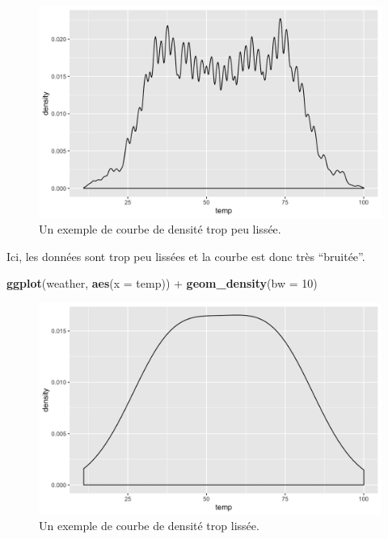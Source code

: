 \documentclass[a4paperpaper,]{article}
\newenvironment{Shaded}{\begin{snugshade}}{\end{snugshade}}
\newcommand{\DataTypeTok}[1]{\textcolor[rgb]{0.00,0.34,0.68}{#1}}
\newcommand{\DecValTok}[1]{\textcolor[rgb]{0.69,0.50,0.00}{#1}}
\newcommand{\KeywordTok}[1]{\textcolor[rgb]{0.12,0.11,0.11}{\textbf{#1}}}
\newcommand{\NormalTok}[1]{\textcolor[rgb]{0.12,0.11,0.11}{#1}}
\newcommand{\OperatorTok}[1]{\textcolor[rgb]{0.12,0.11,0.11}{#1}}
\newcommand{\StringTok}[1]{\textcolor[rgb]{0.75,0.01,0.01}{#1}}
\begin{document}
\begin{figure}[htpb]

{\centering \includegraphics[width=0.9\linewidth]{figure/densitynarrow-1} 

}

\caption{Un exemple de courbe de densité trop peu lissée.}\label{fig:densitynarrow}
\end{figure}

Ici, les données sont trop peu lissées et la courbe est donc très ``bruitée''.

\begin{Shaded}
\begin{Highlighting}[]
\KeywordTok{ggplot}\NormalTok{(weather, }\KeywordTok{aes}\NormalTok{(}\DataTypeTok{x =}\NormalTok{ temp)) }\OperatorTok{+}
\StringTok{  }\KeywordTok{geom_density}\NormalTok{(}\DataTypeTok{bw =} \DecValTok{10}\NormalTok{)}
\end{Highlighting}
\end{Shaded}

\begin{figure}[htpb]

{\centering \includegraphics[width=0.9\linewidth]{figure/densitywide-1} 

}

\caption{Un exemple de courbe de densité trop lissée.}\label{fig:densitywide}
\end{figure}
\end{document}

